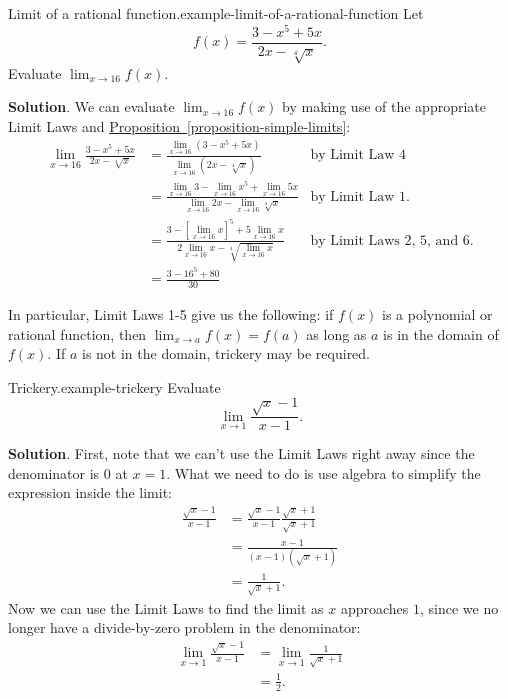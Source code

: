 \documentclass[10pt,]{book}
\numberwithin{equation}{section}
\begin{document}
\begin{example}{Limit of a rational function.}{example-limit-of-a-rational-function}%
\hypertarget{p-25}{}%
Let%
\begin{equation*}
f(x) = \frac{3 - x^{5} + 5x}{2x-\sqrt[4]{x}}.
\end{equation*}
Evaluate \(\lim_{x\to 16}f(x)\).%
\par\smallskip%
\noindent\textbf{Solution}.\hypertarget{solution-4}{}\quad%
\hypertarget{p-26}{}%
We can evaluate \(\lim_{x\to 16}f(x)\) by making use of the appropriate Limit Laws and \hyperref[proposition-simple-limits]{Proposition~\ref{proposition-simple-limits}}:%
%
\begin{align*}
\lim_{x\to 16}\frac{3 - x^{5} + 5x}{2x-\sqrt[4]{x}} & = \frac{\lim_{x\to 16}(3 - x^{5} + 5x)}{\lim_{x\to 16}(2x-\sqrt[4]{x})} & \text{by Limit Law 4}\\
& = \frac{\lim_{x\to 16}3 - \lim_{x\to 16}x^{5} + \lim_{x\to 16}5x}{\lim_{x\to 16}2x-\lim_{x\to 16}\sqrt[4]{x}} & \text{by Limit Law 1.} \\
& = \frac{3 - [\lim_{x\to 16}x]^{5} + 5\lim_{x\to 16}x}{2\lim_{x\to 16}x-\sqrt[4]{\lim_{x\to 16}x}} & \text{by Limit Laws 2, 5, and 6.} \\
& = \frac{3-16^{5}+80}{30} &
\end{align*}
\end{example}
\hypertarget{p-27}{}%
In particular, Limit Laws 1-5 give us the following: if \(f(x)\) is a polynomial or rational function, then \(\lim_{x\to a}f(x) = f(a)\) as long as \(a\) is in the domain of \(f(x)\). If \(a\) is not in the domain, trickery may be required.%
\begin{example}{Trickery.}{example-trickery}%
\hypertarget{p-28}{}%
Evaluate%
\begin{equation*}
\lim_{x\to1}\frac{\sqrt{x}-1}{x-1}.
\end{equation*}
%
\par\smallskip%
\noindent\textbf{Solution}.\hypertarget{solution-5}{}\quad%
\hypertarget{p-29}{}%
First, note that we can't use the Limit Laws right away since the denominator is \(0\) at \(x=1\). What we need to do is use algebra to simplify the expression inside the limit:%
%
\begin{align*}
\frac{\sqrt{x}-1}{x-1} & = \frac{\sqrt{x}-1}{x-1}\frac{\sqrt{x}+1}{\sqrt{x}+1} \\
& = \frac{x - 1}{(x-1)(\sqrt{x}+1)} \\
& = \frac{1}{\sqrt{x}+1}. 
\end{align*}
\hypertarget{p-30}{}%
Now we can use the Limit Laws to find the limit as \(x\) approaches \(1\), since we no longer have a divide-by-zero problem in the denominator:%
%
\begin{align*}
\lim_{x\to1}\frac{\sqrt{x}-1}{x-1} & = \lim_{x\to1}\frac{1}{\sqrt{x}+1} \\
& = \frac{1}{2}. 
\end{align*}
\end{example}
%
%
\typeout{************************************************}
\typeout{************************************************}
%
\end{document}
